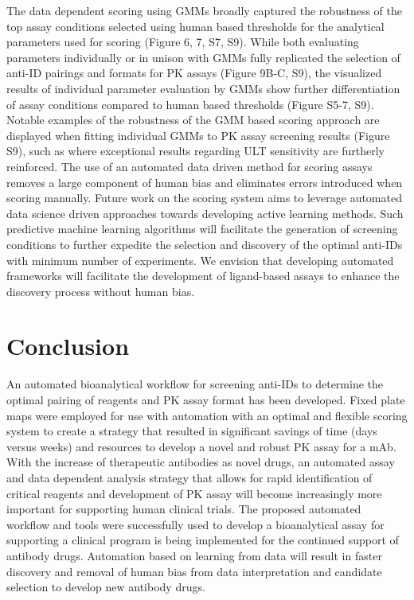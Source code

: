The data dependent scoring using GMMs broadly captured the robustness of the top assay conditions selected using human based thresholds for the analytical parameters used for scoring (Figure 6, 7, S7, S9).  While both evaluating parameters individually or in unison with GMMs fully replicated the selection of anti-ID pairings and formats for PK assays (Figure 9B-C, S9), the visualized results of individual parameter evaluation by GMMs show further differentiation of assay conditions compared to human based thresholds (Figure S5-7, S9).  Notable examples of the robustness of the GMM based scoring approach are displayed when fitting individual GMMs to PK assay screening results (Figure S9), such as where exceptional results regarding ULT sensitivity are furtherly reinforced.  The use of an automated data driven method for scoring assays removes a large component of human bias and eliminates errors introduced when scoring manually.  Future work on the scoring system aims to leverage automated data science driven approaches towards developing active learning methods. Such predictive machine learning algorithms will facilitate the generation of screening conditions to further expedite the selection and discovery of the optimal anti-IDs with minimum number of experiments.  We envision that developing automated frameworks will facilitate the development of ligand-based assays to enhance the discovery process without human bias.

\section{Conclusion}
An automated bioanalytical workflow for screening anti-IDs to determine the optimal pairing of reagents and PK assay format has been developed.  Fixed plate maps were employed for use with automation with an optimal and flexible scoring system to create a strategy that resulted in significant savings of time (days versus weeks) and resources to develop a novel and robust PK assay for a mAb.  With the increase of therapeutic antibodies as novel drugs, an automated assay and data dependent analysis strategy that allows for rapid identification of critical reagents and development of PK assay will become increasingly more important for supporting human clinical trials.  The proposed automated workflow and tools were successfully used to develop a bioanalytical assay for supporting a clinical program is being implemented for the continued support of antibody drugs. Automation based on learning from data will result in faster discovery and removal of human bias from data interpretation and candidate selection to develop new antibody drugs.

